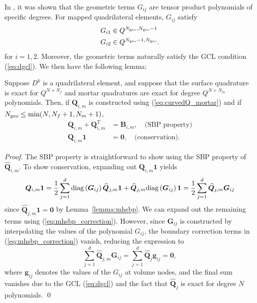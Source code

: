 \documentclass{svjour3}                     %
\renewcommand{\hat}{\widehat}
\newcommand{\diag}[1]{{\rm diag}\LRp{#1}}
\newcommand{\LRp}[1]{\left( #1 \right)}
\renewcommand{\note}[1]{{\color{blue}{#1}}}
\begin{document}
In \cite{chan2019skew}, it was shown that the geometric terms $G_{ij}$ are tensor product polynomials of specific degrees.  For mapped quadrilateral elements, $G_{ij}$ satisfy
\begin{align*}
&G_{i1} \in Q^{N_{\rm geo},N_{\rm geo}-1}\\
&G_{i2} \in Q^{N_{\rm geo}-1,N_{\rm geo}}.
\end{align*}
for $i = 1,2$.  Moreover, the geometric terms naturally satisfy the GCL condition (\ref{eq:dgcl}).  We then have the following lemma:
\begin{lemma}
\label{lemma:Qmprops_2d}
Suppose $D^k$ is a quadrilateral element, and suppose that the surface quadrature is exact for $Q^{N+N_f}$ and mortar quadratures are exact for degree $Q^{N+N_m}$ polynomials.  Then, if $\bm{Q}_{i,m}$ is constructed using (\ref{eq:curvedQ_mortar}) and if $N_{\rm geo} \leq \min(N,N_f+1,N_m+1)$,
\begin{align*}
\bm{Q}_{i,m} + \bm{Q}_{i,m}^T &= \bm{B}_{i,m}, \quad \text{(SBP property)}\\
\bm{Q}_{i,m}\bm{1} &= \bm{0}, \quad \text{(conservation)}.
\end{align*}
\end{lemma}
\begin{proof}
The SBP property is straightforward to show using the SBP property of $\hat{\bm{Q}}_{i,m}$.  To show conservation, expanding out $\bm{Q}_{i,m}\bm{1} $ yields
\[
\bm{Q}_{i,m}\bm{1} = \frac{1}{2}\sum_{j=1}^d \diag{\bm{G}_{ij}}\hat{\bm{Q}}_{j,m}\bm{1} + \hat{\bm{Q}}_{j,m} \diag{\bm{G}_{ij}}\bm{1} = \frac{1}{2}\sum_{j=1}^d\hat{\bm{Q}}_{j,m} \bm{G}_{ij}
\]
since $\hat{\bm{Q}}_{j,m}\bm{1} = \bm{0}$ by Lemma~\ref{lemma:mhsbp}.  We can expand out the remaining terms using (\ref{eq:mhsbp_correction}).  However, since $\bm{G}_{ij}$ is constructed by interpolating the values of the polynomial $G_{ij}$, the boundary correction terms in (\ref{eq:mhsbp_correction}) vanish, reducing the expression to 
\[
\sum_{j=1}^d\hat{\bm{Q}}_{j,m} \bm{G}_{ij} = \sum_{j=1}^d\hat{\bm{Q}}_{j} \bm{g}_{ij} = \bm{0},
\]
where $\bm{g}_{ij}$ denotes the values of the $G_{ij}$ at volume nodes, and the final sum vanishes due to the GCL (\ref{eq:dgcl}) and the fact that $\hat{\bm{Q}}_j$ is exact for degree $N$ polynomials.  
\note{Fix to add in tensor product quadrature.}
\qed\end{proof}
\end{document}
